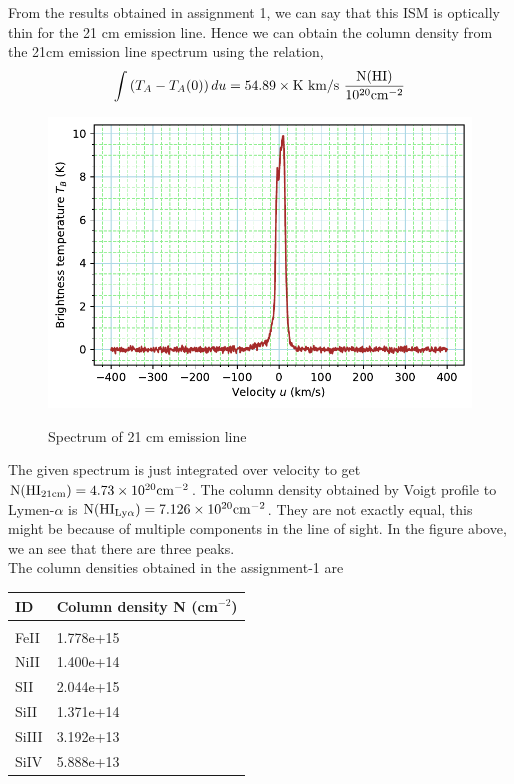 \documentclass{jhwhw}
\begin{document}






\solution
From the results obtained in assignment 1, we can say that this ISM is optically thin
for the 21 cm emission line. Hence we can obtain the column density from the 21cm emission line spectrum using the relation,
\begin{align}
\int \left( T_A - T_A(0)\right)  du = 54.89 \times \rm{K~ km/s} ~\frac{N(HI)}{10^{20} \rm{cm^{-2}}} 
\end{align}
%

\begin{figure}[H]
\centering
\caption{Spectrum of 21 cm emission line}
\includegraphics[width=1\linewidth]{../prob-2-plot1}
\label{fig:prob-2-plot1}
\end{figure}



The given spectrum is just integrated over velocity to get
$\rm{N(HI_{21cm}) = 4.73 \times 10^{20} cm^{-2}}$.
%
The column density obtained by Voigt profile to Lymen-$\alpha$ is 
$\rm{N(HI_{Ly \alpha}) = 7.126 \times 10^{20} cm^{-2}}$.
They are not exactly equal, this might be because of multiple components in the line of sight. In the figure above, we an see that there are three peaks.\\

\newpage
\noindent
The column densities obtained in the assignment-1 are
\begin{table}[H]
\centering
\begin{tabular}{l|l}
ID & Column density N (cm$^{-2}$)\\
\hline & \\
FeII  & 1.778e+15 \\
NiII  & 1.400e+14 \\
SII   & 2.044e+15 \\
SiII  & 1.371e+14 \\
SiIII & 3.192e+13 \\
SiIV  & 5.888e+13 \\
\end{tabular}
\end{table}
\end{document}
